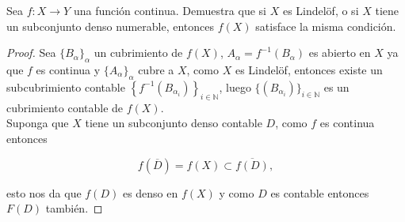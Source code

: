 
  \item Sea $f: X \to Y$ una función continua. Demuestra que si $X$ es Lindelöf, o si $X$ tiene un subconjunto denso numerable, entonces $f(X)$ satisface la misma condición.
\begin{proof}
  Sea $\{B_\alpha\}_\alpha$ un cubrimiento de $f(X)$, $A_\alpha=f^{-1}(B_\alpha)$ es abierto en $X$ ya que $f$ es continua y $\{A_\alpha\}_\alpha$ cubre a $X$, como $X$ es Lindelöf, entonces existe un subcubrimiento contable $\left\{f^{-1}(B_{\alpha_i})\right\}_{i\in \mathbb{N}}$, luego $\{(B_{\alpha_i})\}_{i\in \mathbb{N}}$ es un cubrimiento contable de $f(X)$.\\

  Suponga que $X$ tiene un subconjunto denso contable $D$, como $f$ es continua entonces

  $$f(\overline{D})=f(X)\subset \overline{f(D)},$$

  esto nos da que $f(D)$ es denso en $f(X)$ y como $D$ es contable entonces $F(D)$ también.
\end{proof}